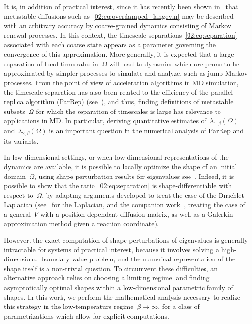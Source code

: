     It is, in addition of practical interest, since it has recently been shown in~\cite{AGHVP20,AJP23} that metastable diffusions such as~\eqref{02:eq:overdamped_langevin} may be described with an arbitrary accuracy by coarse-grained dynamics consisting of Markov renewal processes.
    In this context, the timescale separations~\eqref{02:eq:separation} associated with each coarse state appears as a parameter governing the convergence of this approximation. More generally, it is expected that a large separation of local timescales in~$\Omega$ will lead to dynamics which are prone to be approximated by simpler processes to simulate and analyze, such as jump Markov processes. 
    From the point of view of acceleration algorithms in MD simulation, the timescale separation has also been related to the efficiency of the parallel replica algorithm (ParRep) (see~\cite{LBLLP12,SL13,PUV15}), and thus, finding definitions of metastable subsets~$\Omega$ for which the separation of timescales is large has relevance to applications in MD.
    In particular, deriving quantitative estimates of~$\lambda_{1,\beta}(\Omega)$ and~$\lambda_{2,\beta}(\Omega)$ is an important question in the numerical analysis of ParRep and its variants.

    In low-dimensional settings, or when low-dimensional representations of the dynamics are available, it is possible to locally optimize the shape of an initial domain~$\Omega$, using shape perturbation results for eigenvalues see~\cite{HR80a,HR80b,HR83,HP05,H05}.
    Indeed, it is possible to show that the ratio~\eqref{02:eq:separation} is shape-differentiable with respect to~$\Omega$, by adapting arguments developed to treat the case of the Dirichlet Laplacian (see~\cite{H05,HP05} for the Laplacian, and the companion work~\cite{BLS25b}, treating the case of a general~$V$ with a position-dependent diffusion matrix, as well as a Galerkin approximation method given a reaction coordinate).

    However, the exact computation of shape perturbations of eigenvalues is generally intractable for systems of practical interest, because it involves solving a high-dimensional boundary value problem, and the numerical representation of the shape itself is a non-trivial question. To circumvent these difficulties, an alternative approach relies on choosing a limiting regime, and finding asymptotically optimal shapes within a low-dimensional parametric family of shapes. In this work, we perform the mathematical analysis necessary to realize this strategy in the low-temperature regime~$\beta\to\infty$, for a class of parametrizations which allow for explicit computations.
    
